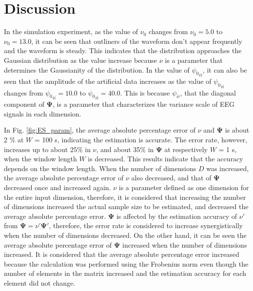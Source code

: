 \documentclass[journal]{IEEEtran}
\begin{document}
\section{Discussion}
In the simulation experiment, as the value of $\nu_0$ changes from $\nu_0 = 5.0$ to $\nu_0 = 13.0$, it can be seen that outliners of the waveform don't appear frequently and the waveform is steady.
This indicates that the distribution approaches the Gaussian distribution as the value increase because $\nu$ is a parameter that determines the Gaussianity of the distribution.
In the value of ${\psi_0}_{ii}$, it can also be seen that the amplitude of the artificial data increases as the value of ${\psi_0}_{ii}$ changes from ${\psi_0}_{ii}=10.0$ to ${\psi_0}_{ii}=40.0$.
This is because $\psi_{ii}$, that the diagonal component of $\mathbf{\Psi}$, is a parameter that characterizes the variance scale of EEG signals in each dimension.

In Fig. \ref{fig:ES_param}, the average absolute percentage error of $\nu$ and $\mathbf{\Psi}$ is about 2 \% at $W$ = 100 s, indicating the estimation is accurate. The error rate, however, increases up to about 25\% in $\nu$, and about 35\% in $\mathbf{\Psi}$ at respectively $W$ = 1 s, when the window length $W$ is decreased. This results indicate that the accuracy depends on the window length.
When the number of dimensions $D$ was increased, the average absolute percentage error of $\nu$ also decreased, and that of $\mathbf{\Psi}$ decreased once and increased again.
$\nu$ is a parameter defined as one dimension for the entire input dimension, therefore, it is considered that increasing the number of dimensions increased the actual sample size to be estimated, and decreased the average absolute percentage error.
$\mathbf{\Psi}$ is affected by the estimation accuracy of $\nu'$ from $\mathbf{\Psi} = \nu' \mathbf{\Psi}'$, therefore, the error rate is considered to increase synergistically when the number of dimensions decreased.
On the other hand, it can be seen the average absolute percentage error of $\mathbf{\Psi}$ increased when the number of dimensions increased.
It is considered that the average absolute percentage error increased because the calculation was performed using the Frobenius norm even though the number of elements in the matrix increased and the estimation accuracy for each element did not change. %
\end{document}
